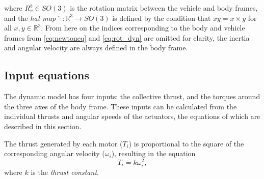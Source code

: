 where $R_v^b\in SO(3)$ is the rotation matrix between the vehicle and body frames, and the \textit{hat map} $\hat{\cdot}:\mathbb{R}^3\rightarrow SO(3)$ is defined by the condition that $\hat{x}y = x\times y$ for all $x,y\in \mathbb{R}^3$. From here on the indices corresponding to the body and vehicle frames from \eqref{eq:newtoneq} and \eqref{eq:rot_dyn} are omitted for clarity, the inertia and angular velocity are always defined in the body frame. %

\subsection{Input equations}
The dynamic model has four inputs: the collective thrust, and the torques around the three axes of the body frame. These inputs can be calculated from the individual thrusts and angular speeds of the actuators, the equations of which are described in this section.

The thrust generated by each motor ($T_i$) is proportional to the square of the corresponding angular velocity ($\omega_i$), resulting in the equation
\begin{equation}
T_i = k\omega_i^2,\label{eq:thrustconstant}
\end{equation}
where $k$ is the \textit{thrust constant}. 


